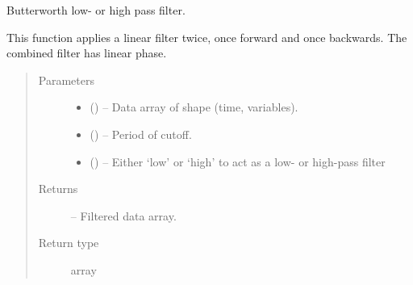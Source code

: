 \documentclass[letterpaper,10pt,english]{sphinxmanual}
\begin{document}

\begin{fulllineitems}
\label{\detokenize{index:tigramite.data_processing.lowhighpass_filter}}
Butterworth low- or high pass filter.

This function applies a linear filter twice, once forward and once
backwards. The combined filter has linear phase.
\begin{quote}\begin{description}
\item[{Parameters}] \leavevmode\begin{itemize}
\item {} 
 () -- Data array of shape (time, variables).

\item {} 
 () -- Period of cutoff.

\item {} 
 (\sphinxstyleliteralemphasis{, }\sphinxstyleliteralemphasis{ (}\sphinxstyleliteralemphasis{)}\sphinxstyleliteralemphasis{}) -- Either `low' or `high' to act as a low- or high-pass filter

\end{itemize}

\item[{Returns}] \leavevmode
{} -- Filtered data array.

\item[{Return type}] \leavevmode
array

\end{description}\end{quote}

\end{fulllineitems}

\end{document}
